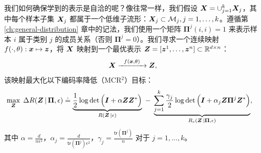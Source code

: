 \documentclass[../../book-main.tex]{subfiles}
\begin{document}

我们如何确保学到的表示是自洽的呢？像往常一样，我们假设 $\bm{X} = \cup_{j=1}^k \bm{X}_j$，其中每个样本子集 $\bm{X}_j$ 都属于一个低维子流形：$\bm{X}_j \subset \mathcal{M}_j, j = 1,\ldots, k$。遵循第 \ref{ch:general-distribution} 章中的记法，我们使用一个矩阵 $\bm \Pi^j(i,i) = 1$ 来表示样本 $i$ 属于类别 $j$ 的成员关系（否则 $\bm \Pi^j = 0$）。我们寻求一个连续映射 $f(\cdot,\theta): \bm{x} \mapsto \bm{z}$，将 $\bm{X}$ 映射到一个最优表示 $\bm{Z} = [\bm{z}^1, \ldots, \bm{z}^n] \subset \mathbb{R}^{d \times n}$：
\begin{equation}
\bm X  \xrightarrow{\hspace{2mm} f(\bm{x}, \theta)\hspace{2mm}} \bm Z, 
\label{eqn:LDR}
\end{equation}
该映射最大化以下编码率降低（MCR$^2$）目标：
\begin{equation}\label{eq:mcr2-formulation}
\begin{split}
\max_{\Z} \; \Delta R(\Z\, | \, \bm{\Pi}, \epsilon) %
&\doteq \underbrace{\frac{1}{2}\log\det \Big(\I + {\alpha} \Z \Z^{*} \Big)}_{R(\Z\, | \epsilon)} \;-\; \underbrace{\sum_{j=1}^{k}\frac{\gamma_j}{2} \log\det\Big(\I + {\alpha_j} \Z \bm{\Pi}^{j} \Z^{*} \Big)}_{R_c(\Z \,|\bm \Pi, \epsilon)},
\end{split}
\end{equation}
其中 $\alpha=\frac{d}{n\epsilon^2}$，$\alpha_j=\frac{d}{\textsf{tr}(\bm{\Pi}^{j})\epsilon^2}$，$\gamma_j=\frac{\textsf{tr}(\bm{\Pi}^{j})}{n}$ 对于 $j = 1,\ldots, k$。
\end{document}
